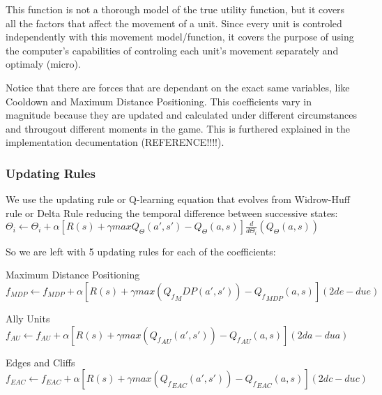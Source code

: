 This function is not a thorough model of the true utility function, but it covers all the factors that affect the movement of a unit. Since every unit is controled independently with this movement model/function, it covers the purpose of using the computer's capabilities of controling each unit's movement separately and optimaly (micro).

Notice that there are forces that are dependant on the exact same variables, like Cooldown and Maximum Distance Positioning. This coefficients vary in magnitude because they are updated and calculated under different circumstances and througout different moments in the game. This is furthered explained in the implementation decumentation (REFERENCE!!!!). 

\subsubsection{Updating Rules}

We use the updating rule or Q-learning equation that evolves from Widrow-Huff rule or Delta Rule reducing the temporal difference between successive states:  \cite[p779]{rl} \\ 
 
$\Theta_i \leftarrow \Theta_i + \alpha [ R(s) + \gamma maxQ_\Theta(a',s')-Q_\Theta(a,s) ] \frac{d}{d\Theta_i}(Q_\Theta(a,s))$ \\ 


\begin{flushleft}
So we are left with 5 updating rules for each of the coefficients:
\end{flushleft} 

\begin{flushleft}
Maximum Distance Positioning 
$f_{MDP}  \leftarrow f_{MDP}  + \alpha [ R(s) + \gamma max({Q_f}_MDP (a',s'))-{Q_f}_{MDP} (a,s) ](2de - due)$
\end{flushleft} 

\begin{flushleft}
Ally Units  \\ 
$f_{AU}  \leftarrow f_{AU} + \alpha [ R(s) + \gamma max({Q_f}_{AU} (a',s'))-{Q_f}_{AU} (a,s) ](2da - dua)$ 
\end{flushleft} 

\begin{flushleft}
Edges and Cliffs
$f_{EAC}  \leftarrow f_{EAC}  + \alpha [ R(s) + \gamma max({Q_f}_{EAC} (a',s'))-{Q_f}_{EAC} (a,s) ] (2dc - duc)$ 
\end{flushleft} 


